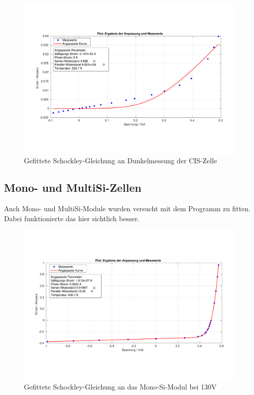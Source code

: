 \begin{figure}[ht]
    \centering
    \includegraphics[width = \linewidth]{Bilder/CISDunkelPlot.pdf}
    \caption{Gefittete Schockley-Gleichung an Dunkelmessung der CIS-Zelle}
\end{figure}

\clearpage

\subsection{Mono- und MultiSi-Zellen}

Auch Mono- und MultiSi-Module wurden versucht mit dem Programm zu fitten. Dabei funktionierte das hier sichtlich besser.

\begin{figure}[ht]
    \centering
    \includegraphics[width = \linewidth]{Bilder/SiMono130Plot.pdf}
    \caption{Gefittete Schockley-Gleichung an das Mono-Si-Modul bei 130V}
\end{figure}

